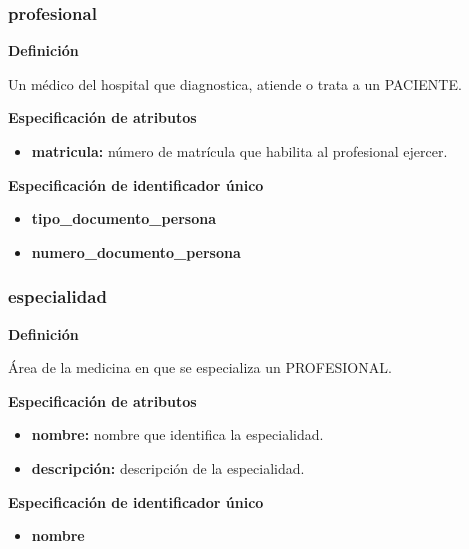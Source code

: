 \documentclass[a4paper,11pt]{article}
\begin{document}
\subsubsection{\textbf{profesional}}

\textbf{Definición}

Un médico del hospital que diagnostica, atiende o trata a un PACIENTE.

\textbf{Especificación de atributos}

\begin{itemize}

     \item \textbf{matricula:} número de matrícula que habilita al profesional ejercer.

\end{itemize}

\textbf{Especificación de identificador único}

\begin{itemize}

    \item \textbf{tipo\_documento\_persona}
   
    \item \textbf{numero\_documento\_persona}

\end{itemize}

\subsubsection{\textbf{especialidad}}

\textbf{Definición}

Área de la medicina en que se especializa un PROFESIONAL.

\textbf{Especificación de atributos}

\begin{itemize}

     \item \textbf{nombre:} nombre que identifica la especialidad.

     \item \textbf{descripción:} descripción de la especialidad.

\end{itemize}

\textbf{Especificación de identificador único}

\begin{itemize}

     \item \textbf{nombre}

\end{itemize}
\end{document}

